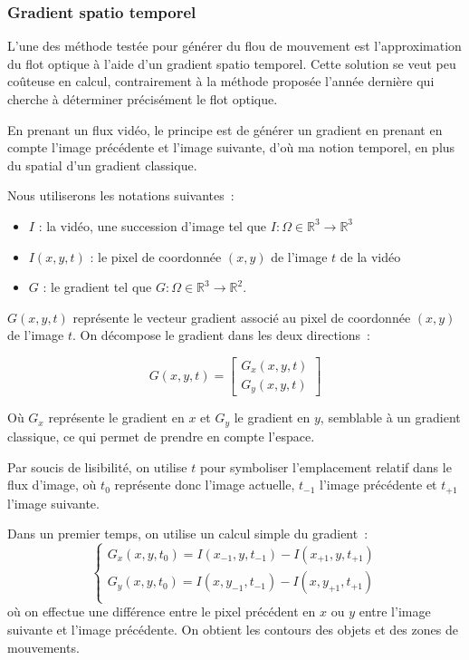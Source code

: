 \documentclass[fleqn,10pt]{SelfArx} %
\begin{document}
%
\subsubsection{Gradient spatio temporel}
L'une des méthode testée pour générer du flou de mouvement est l'approximation du flot optique à l'aide
d'un gradient spatio temporel.
Cette solution se veut peu coûteuse en calcul, contrairement à la méthode proposée l'année
dernière\cite{hfr2lfr2015} qui cherche à déterminer précisément le flot optique.

En prenant un flux vidéo, le principe est de générer un gradient en prenant en compte l'image précédente et
l'image suivante, d'où ma notion temporel, en plus du spatial d'un gradient classique.

Nous utiliserons les notations suivantes~:
\begin{itemize}
    \item $I$ : la vidéo, une succession d'image tel que $I : \Omega \in \mathbb{R}^{3} \to \mathbb{R}^{3} $
    \item $I(x, y, t)$ : le pixel de coordonnée $(x, y)$ de l'image $t$ de la vidéo
    \item $G$ : le gradient tel que $ G : \Omega \in \mathbb{R}^{3} \to \mathbb{R}^{2} $.

\end{itemize}

$G(x, y, t)$ représente le vecteur gradient associé au pixel de coordonnée $(x, y)$ de l'image $t$.
On décompose le gradient dans les deux directions~:

\[G(x,y,t) = 
    \begin{bmatrix}
        G_{x}(x,y,t) \\
        G_{y}(x,y,t)
    \end{bmatrix}
\]

Où $G_{x}$ représente le gradient en $x$ et $G_{y}$ le gradient en $y$, semblable à un gradient classique, 
ce qui permet de prendre en compte l'espace.

Par soucis de lisibilité, on utilise $t$ pour symboliser l'emplacement relatif dans le flux d'image, où $t_{0}$ représente donc
l'image actuelle, $t_{-1}$ l'image précédente et $t_{+1}$ l'image suivante.

Dans un premier temps, on utilise un calcul simple du gradient~:
\[
    \begin{cases}
        G_{x}(x,y,t_{0}) = I(x_{-1}, y, t_{-1}) - I(x_{+1}, y, t_{+1}) \\
        G_{y}(x,y,t_{0}) = I(x, y_{-1}, t_{-1}) - I(x, y_{+1}, t_{+1}) \\
    \end{cases}
\]
où on effectue une différence entre le pixel précédent en $x$ ou $y$ entre l'image suivante et l'image
précédente. On obtient les contours des objets et des zones de mouvements.
\end{document}
